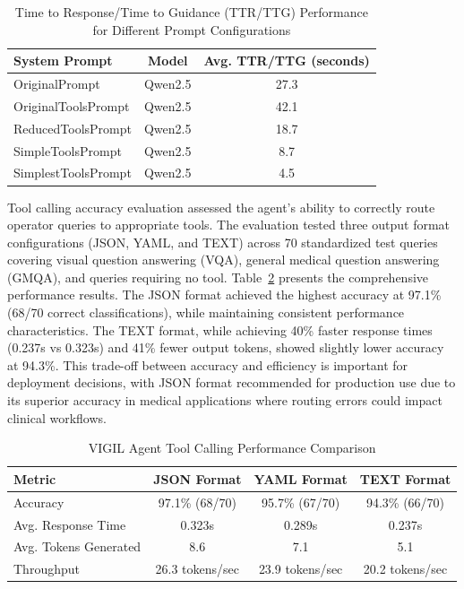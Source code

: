 \documentclass[12pt,a4paper]{article}
\begin{document}
\begin{table}[h]
\centering
\caption{Time to Response/Time to Guidance (TTR/TTG) Performance for Different Prompt Configurations}
\label{tab:ttr_performance}
\begin{tabular}{lcc}
\toprule
\textbf{System Prompt} & \textbf{Model} & \textbf{Avg. TTR/TTG (seconds)} \\
\midrule
OriginalPrompt & Qwen2.5 & 27.3 \\
OriginalToolsPrompt & Qwen2.5 & 42.1 \\
ReducedToolsPrompt & Qwen2.5 & 18.7 \\
SimpleToolsPrompt & Qwen2.5 & 8.7 \\
SimplestToolsPrompt & Qwen2.5 & 4.5 \\
\bottomrule
\end{tabular}
\end{table}

Tool calling accuracy evaluation assessed the agent's ability to correctly route operator queries to appropriate tools. The evaluation tested three output format configurations (JSON, YAML, and TEXT) across 70 standardized test queries covering visual question answering (VQA), general medical question answering (GMQA), and queries requiring no tool. Table~\ref{tab:tool_calling_performance} presents the comprehensive performance results. The JSON format achieved the highest accuracy at 97.1\% (68/70 correct classifications), while maintaining consistent performance characteristics. The TEXT format, while achieving 40\% faster response times (0.237s vs 0.323s) and 41\% fewer output tokens, showed slightly lower accuracy at 94.3\%. This trade-off between accuracy and efficiency is important for deployment decisions, with JSON format recommended for production use due to its superior accuracy in medical applications where routing errors could impact clinical workflows.

\begin{table}[h]
\centering
\caption{VIGIL Agent Tool Calling Performance Comparison}
\label{tab:tool_calling_performance}
\begin{tabular}{lccc}
\toprule
\textbf{Metric} & \textbf{JSON Format} & \textbf{YAML Format} & \textbf{TEXT Format} \\
\midrule
Accuracy & 97.1\% (68/70) & 95.7\% (67/70) & 94.3\% (66/70) \\
Avg. Response Time & 0.323s & 0.289s & 0.237s \\
Avg. Tokens Generated & 8.6 & 7.1 & 5.1 \\
Throughput & 26.3 tokens/sec & 23.9 tokens/sec & 20.2 tokens/sec \\
\bottomrule
\end{tabular}
\end{table}
\end{document}

